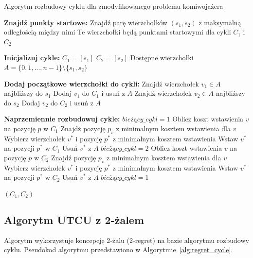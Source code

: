 \documentclass[12pt,a4paper]{article}
\begin{document}
\begin{algorithm}
\caption{Algorytm rozbudowy cyklu dla zmodyfikowanego problemu komiwojażera}
\label{alg:greedy_cycle}
\begin{algorithmic}[1]
\State \textbf{Znajdź punkty startowe:}
\State Znajdź parę wierzchołków $(s_1, s_2)$ z maksymalną odległością między nimi
\State Te wierzchołki będą punktami startowymi dla cykli $C_1$ i $C_2$

\State \textbf{Inicjalizuj cykle:}
\State $C_1 = [s_1]$
\State $C_2 = [s_2]$
\State Dostępne wierzchołki $A = \{0, 1, ..., n-1\} \setminus \{s_1, s_2\}$

\State \textbf{Dodaj początkowe wierzchołki do cykli:}
    \State Znajdź wierzchołek $v_1 \in A$ najbliższy do $s_1$
    \State Dodaj $v_1$ do $C_1$ i usuń z $A$
        \State Znajdź wierzchołek $v_2 \in A$ najbliższy do $s_2$
        \State Dodaj $v_2$ do $C_2$ i usuń z $A$
    \EndIf
\EndIf

\State \textbf{Naprzemiennie rozbudowuj cykle:}
\State $bieżący\_cykl = 1$ 
                \State Oblicz koszt wstawienia $v$ na pozycję $p$ w $C_1$
            \EndFor
            \State Znajdź pozycję $p_v$ z minimalnym kosztem wstawienia dla $v$
        \EndFor
        \State Wybierz wierzchołek $v^*$ i pozycję $p^*$ z minimalnym kosztem wstawienia
        \State Wstaw $v^*$ na pozycji $p^*$ w $C_1$
        \State Usuń $v^*$ z $A$
        \State $bieżący\_cykl = 2$
    \Else
                \State Oblicz koszt wstawienia $v$ na pozycję $p$ w $C_2$
            \EndFor
            \State Znajdź pozycję $p_v$ z minimalnym kosztem wstawienia dla $v$
        \EndFor
        \State Wybierz wierzchołek $v^*$ i pozycję $p^*$ z minimalnym kosztem wstawienia
        \State Wstaw $v^*$ na pozycji $p^*$ w $C_2$
        \State Usuń $v^*$ z $A$
        \State $bieżący\_cykl = 1$
    \EndIf
\EndWhile

\State \Return $(C_1, C_2)$
\end{algorithmic}
\end{algorithm}

\subsection{Algorytm UTCU z 2-żalem}
Algorytm wykorzystuje koncepcję 2-żalu (2-regret) na bazie algorytmu rozbudowy cyklu. Pseudokod algorytmu przedstawiono w Algorytmie~\ref{alg:regret_cycle}.
\end{document}
